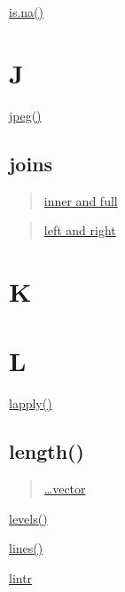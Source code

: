 \documentclass[]{book}
\begin{document}
\href{https://linkedin-learning.pxf.io/rweekly_na}{is.na()}

\hypertarget{j}{%
\chapter*{J}\label{j}}

\href{linkedin-learning.pxf.io/rweekly_plottofile}{jpeg()}

\hypertarget{joins}{%
\section*{joins}\label{joins}}

\begin{quote}
\href{https://linkedin-learning.pxf.io/rweekly_innerfull}{inner and full}
\end{quote}

\begin{quote}
\href{https://linkedin-learning.pxf.io/rwkly_leftrightjoin}{left and right}
\end{quote}

\hypertarget{k}{%
\chapter*{K}\label{k}}

\hypertarget{l}{%
\chapter*{L}\label{l}}

\href{https://linkedin-learning.pxf.io/apply}{lapply()}

\hypertarget{length}{%
\section*{length()}\label{length}}

\begin{quote}
\href{https://linkedin-learning.pxf.io/rwkly_vector}{\ldots{}vector}
\end{quote}

\href{https://linkedin-learning.pxf.io/rweekly_factor}{levels()}

\href{https://linkedin-learning.pxf.io/plot}{lines()}

\href{https://linkedin-learning.pxf.io/rweekly_styleguides}{lintr}
\end{document}
